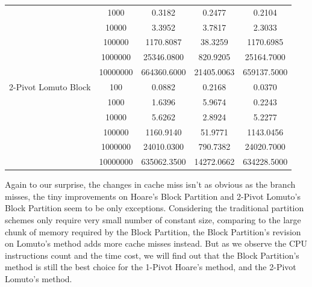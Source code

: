 \documentclass{article}
\begin{document}
\begin{center}
\begin{tabular}{ |c c | c c c| }
                        & 1000     & 0.3182         & 0.2477        & 0.2104 \\
                        & 10000    & 3.3952         & 3.7817        & 2.3033 \\
                        & 100000   & 1170.8087      & 38.3259       & 1170.6985 \\
                        & 1000000  & 25346.0800     & 820.9205      & 25164.7000 \\
                        & 10000000 & 664360.6000    & 21405.0063    & 659137.5000 \\
  2-Pivot Lomuto Block  & 100      & 0.0882         & 0.2168        & 0.0370 \\
                        & 1000     & 1.6396         & 5.9674        & 0.2243 \\
                        & 10000    & 5.6262         & 2.8924        & 5.2277 \\
                        & 100000   & 1160.9140      & 51.9771       & 1143.0456 \\
                        & 1000000  & 24010.0300     & 790.7382      & 24020.7000 \\
                        & 10000000 & 635062.3500    & 14272.0662    & 634228.5000 \\
        \hline
    \end{tabular}
\end{center}

Again to our surprise, the changes in cache miss isn't as obvious as the branch misses, the tiny improvements on Hoare's Block Partition and 2-Pivot Lomuto's Block Partition seem to be only exceptions.
Considering the traditional partition schemes only require very small number of constant size, comparing to the large chunk of memory required by the Block Partition, the Block Partition's revision on Lomuto's method adds more cache misses instead.
But as we observe the CPU instructions count and the time cost, we will find out that the Block Partition's method is still the best choice for the 1-Pivot Hoare's method, and the 2-Pivot Lomuto's method.
\end{document}
